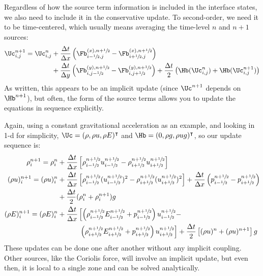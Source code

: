 Regardless of how the source term information is included in the
interface states, we also need to include it in the conservative
update.  To second-order, we need it to be time-centered, which
usually means averaging the time-level $n$ and $n+1$ sources:
\begin{align}
\Uc^{n+1}_{i,j} = \Uc^n_{i,j}
   &+ \frac{\Delta t}{\Delta x} \left ( \Fb^{(x),n+\myhalf}_{i-\myhalf,j} - \Fb^{(x),n+\myhalf}_{i+\myhalf,j} \right ) \nonumber \\
   &+ \frac{\Delta t}{\Delta y} \left ( \Fb^{(y),n+\myhalf}_{i,j-\myhalf} - \Fb^{(y),n+\myhalf}_{i,j+\myhalf} \right ) + \frac{\Delta t}{2} \left (\Hb(\Uc^n_{i,j}) + \Hb(\Uc^{n+1}_{i,j})\right )
\end{align}
As written, this appears to be an implicit update (since $\Uc^{n+1}$
depends on $\Hb^{n+1}$), but often, the form of the source terms allows
you to update the equations in sequence explicitly.

Again, using a constant gravitational acceleration as an example, and
looking in 1-d for simplicity, $\Uc = (\rho, \rho u, \rho E)^\intercal$
and $\Hb = (0, \rho g, \rho u g)^\intercal$, so our update sequence is:
\begin{align}
\rho^{n+1}_i = \rho^n_i &+ \frac{\Delta t}{\Delta x}
   \left [\rho_{i-\myhalf}^{n+\myhalf} u_{i-\myhalf}^{n+\myhalf} -
          \rho_{i+\myhalf}^{n+\myhalf} u_{i+\myhalf}^{n+\myhalf} \right ] \\
(\rho u)^{n+1}_i = (\rho u)^n_i &+ \frac{\Delta t}{\Delta x}
   \left [ \rho_{i-\myhalf}^{n+\myhalf} (u_{i-\myhalf}^{n+\myhalf})^2  -
           \rho_{i+\myhalf}^{n+\myhalf} (u_{i+\myhalf}^{n+\myhalf})^2  \right ]
         + \frac{\Delta t}{\Delta x} \left ( p_{i-\myhalf}^{n+\myhalf} -
                                              p_{i+\myhalf}^{n+\myhalf} \right ) \nonumber \\
       &+ \frac{\Delta t}{2}(\rho^n_i + \rho^{n+1}_i) g \\
(\rho E)^{n+1}_i = (\rho E)^n_i &+ \frac{\Delta t}{\Delta x}
   \left [ \left (\rho_{i-\myhalf}^{n+\myhalf} E_{i-\myhalf}^{n+\myhalf}  + p_{i-\myhalf}^{n+\myhalf} \right ) u_{i-\myhalf}^{n+\myhalf} - \right . \nonumber \\
   &\phantom{+ \frac{\Delta t}{\Delta x} \left[ \right.}   \left .   \left (\rho_{i+\myhalf}^{n+\myhalf} E_{i+\myhalf}^{n+\myhalf}  + p_{i+\myhalf}^{n+\myhalf} \right ) u_{i+\myhalf}^{n+\myhalf} \right ]
    + \frac{\Delta t}{2} \left [ (\rho u)^n + (\rho u)^{n+1} \right] g
\end{align}
These updates can be done one after another without any implicit
coupling.  Other sources, like the Coriolis force, will involve an
implicit update, but even then, it is local to a single zone and can
be solved analytically.

